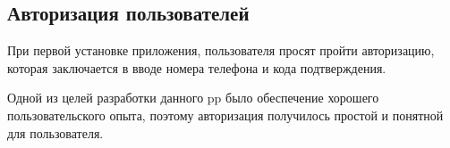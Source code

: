 \subsection{Авторизация пользователей}
\label{sec:usage:auth}

При первой установке приложения, пользователя просят пройти авторизацию, которая заключается в вводе номера телефона и кода подтверждения.




Одной из целей разработки данного \gls{pp} было обеспечение хорошего пользовательского опыта, поэтому авторизация получилось простой и понятной для пользователя.